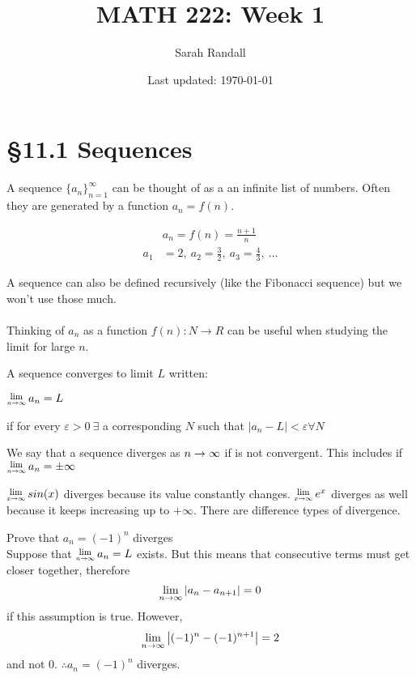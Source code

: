 \documentclass[12 pt]{article}
\author{Sarah Randall}
\date{Last updated: \today}
\title{MATH 222: Week 1}
\begin{document}
	\onehalfspacing
	\maketitle
	\tableofcontents
	\section{\S 11.1 Sequences}
		A sequence $\{a_n\}_{n=1}^{\infty}$ can be thought of as a an infinite
		list of numbers. Often they are generated by a function $a_n=f(n)$.\\
		\begin{exmp*}
			\begin{align*}
				&a_n=f(n)=\frac{n+1}{n}
				\\a_1&=2,\ a_2=\frac{3}{2},\ a_3=\frac{4}{3},\ ...
			\end{align*}
		\end{exmp*}
		A sequence can also be defined recursively (like the Fibonacci sequence)
		but we won't use those much.\\\\
		Thinking of $a_n$ as a function $f(n):N\rightarrow R$ can be useful
		when studying the limit for large $n$.
		\begin{def*}
			A sequence converges to limit $L$ written:
			\begin{center}
				$\Lim{n\toinfty} a_n=L$
			\end{center}
			if for every $\varepsilon>0\ \exists$ a corresponding $N$ such that
			$\left|a_n-L\right| < \varepsilon \forall N$
		\end{def*}
		\begin{def*}
			We say that a sequence diverges as $n\rightarrow\infty$ if is not
			convergent. This includes if $\Lim{n\toinfty}a_n=\pm\infty$
		\end{def*}
		\begin{exmp*}
			$\Lim{x\toinfty}sin(x)$ diverges because its value constantly
			changes. $\Lim{x\toinfty}e^x$ diverges as well because it
			keeps increasing up to $+\infty$. There are difference types of divergence.
		\end{exmp*}
		\begin{exmp*}
			Prove that $a_n=(-1)^n$ diverges
			\\Suppose that $\Lim{n\toinfty} a_n=L$ exists. But this means
			that consecutive terms must get closer together, therefore\\
			$$\lim_{n\rightarrow\infty}\left|a_n-a_{n+1}\right|=0$$
			if this assumption is true. However,
			$$\lim_{n\rightarrow\infty}\left|(-1)^n-(-1)^{n+1}\right|=2$$
			and not 0. $\therefore a_n=(-1)^n$ diverges.\\
		\end{exmp*}
\end{document}
